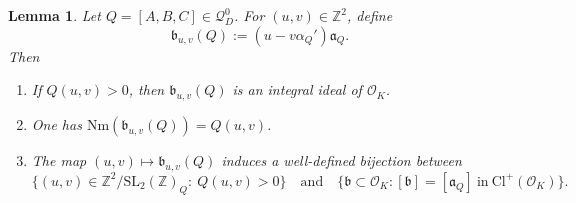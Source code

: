 \documentclass[12pt]{amsart}
\numberwithin{equation}{section}
\newtheorem{lemma}[theorem]{Lemma}
\theoremstyle{definition}
\begin{document}
\begin{lemma}\label{lem-pairtoideal}
Let $Q=[A,B,C]\in\mathcal{Q}_{D}^{0}$.
For $(u,v)\in\mathbb{Z}^{2}$, define
$$\mathfrak{b}_{u,v}(Q):=(u-v\alpha_{Q}')\mathfrak{a}_{Q}.$$
Then
\begin{enumerate}
    \item[\textnormal{(i)}] If $Q(u,v)>0$, then $\mathfrak{b}_{u,v}(Q)$ is an integral ideal of $\mathcal{O}_{K}$.
    \item[\textnormal{(ii)}] One has $\mathrm{Nm}(\mathfrak{b}_{u,v}(Q))=Q(u,v)$.
    \item[\textnormal{(iii)}] The map $(u,v)\mapsto\mathfrak{b}_{u,v}(Q)$ induces a well-defined bijection between
    \begin{equation}\label{eq-pairideal}
        \{(u,v)\in\mathbb{Z}^2/\mathrm{SL}_{2}(\mathbb{Z})_{Q}:\ Q(u,v)>0\}\quad\text{and}\quad
        \{\mathfrak{b}\subset\mathcal{O}_{K}:[\mathfrak{b}]=[\mathfrak{a}_{Q}]~\text{in}~\mathrm{Cl}^{+}(\mathcal{O}_{K})\}.
    \end{equation}
\end{enumerate}
\end{lemma}
\end{document}
